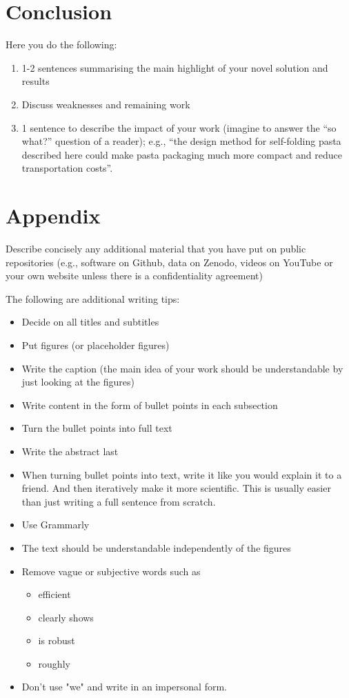 \documentclass[lettersize,journal]{IEEEtran}
\begin{document}
\section{Conclusion}
Here you do the following:
\begin{enumerate}
    \item 1-2 sentences summarising the main highlight of your novel solution and results
    \item Discuss weaknesses and remaining work
    \item 1 sentence to describe the impact of your work (imagine to answer the “so what?” question of a reader); e.g., “the design method for self-folding pasta described here could make pasta packaging much more compact and reduce transportation costs”.
\end{enumerate}



\section*{Appendix}
Describe concisely any additional material that you have put on public repositories (e.g., software on Github, data on Zenodo, videos on YouTube or your own website unless there is a confidentiality agreement)

The following are additional writing tips:
\begin{itemize}
    \item Decide on all titles and subtitles
    \item Put figures (or placeholder figures)
    \item Write the caption (the main idea of your work should be understandable by just looking at the figures)
    \item Write content in the form of bullet points in each subsection
    \item Turn the bullet points into full text
    \item Write the abstract last
    \item When turning bullet points into text, write it like you would explain it to a friend. And then iteratively make it more scientific. This is usually easier than just writing a full sentence from scratch.
    \item Use Grammarly
    \item The text should be understandable independently of the figures
    \item Remove vague or subjective words such as
    \begin{itemize}
        \item efficient
        \item clearly shows
        \item is robust
        \item roughly
    \end{itemize}
    \item Don't use "we" and write in an impersonal form.
\end{itemize}
\end{document}
